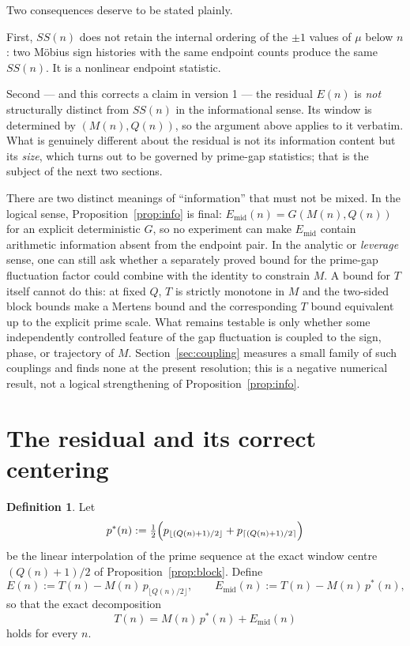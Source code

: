 \documentclass[11pt]{amsart}
\numberwithin{equation}{section}
\theoremstyle{plain}
\theoremstyle{definition}
\newtheorem{definition}[theorem]{Definition}
\theoremstyle{remark}
\newcommand{\mob}{\mu}
\newcommand{\Mert}{M}
\newcommand{\Sq}{Q}
\begin{document}
Two consequences deserve to be stated plainly.

First, $SS(n)$ does not retain the internal ordering of the $\pm1$ values of
$\mob$ below $n$: two M\"obius sign histories with the same endpoint counts
produce the same $SS(n)$. It is a nonlinear endpoint statistic.

Second --- and this corrects a claim in version 1 --- the residual $E(n)$ is
\emph{not} structurally distinct from $SS(n)$ in the informational sense. Its
window is determined by $(\Mert(n),\Sq(n))$, so the argument above applies to it
verbatim. What is genuinely different about the residual is not its information
content but its \emph{size}, which turns out to be governed by prime-gap
statistics; that is the subject of the next two sections.

There are two distinct meanings of ``information'' that must not be mixed.
In the logical sense, Proposition~\ref{prop:info} is final:
$E_{\mathrm{mid}}(n)=G(\Mert(n),\Sq(n))$ for an explicit deterministic $G$, so
no experiment can make $E_{\mathrm{mid}}$ contain arithmetic information absent
from the endpoint pair. In the analytic or \emph{leverage} sense, one can still
ask whether a separately proved bound for the prime-gap fluctuation factor could
combine with the identity to constrain $\Mert$. A bound for $T$ itself cannot do
this: at fixed $\Sq$, $T$ is strictly monotone in $\Mert$ and the two-sided
block bounds make a Mertens bound and the corresponding $T$ bound equivalent up
to the explicit prime scale. What remains testable is only whether some
independently controlled feature of the gap fluctuation is coupled to the sign,
phase, or trajectory of $\Mert$. Section~\ref{sec:coupling} measures a small
family of such couplings and finds none at the present resolution; this is a
negative numerical result, not a logical strengthening of
Proposition~\ref{prop:info}.

\section{The residual and its correct centering}
\label{sec:centering}

\begin{definition}
\label{def:residuals}
Let
\begin{equation}
\label{eq:pstar-definition}
p^{*}(n):=\tfrac12\Bigl(p_{\lfloor (\Sq(n)+1)/2\rfloor}+p_{\lceil (\Sq(n)+1)/2\rceil}\Bigr)
\end{equation}
be the linear interpolation of the prime sequence at the exact window centre
$(\Sq(n)+1)/2$ of Proposition~\ref{prop:block}. Define
\begin{equation}
\label{eq:residual-definitions}
E(n):=T(n)-\Mert(n)\,p_{\lfloor \Sq(n)/2\rfloor},
\qquad
E_{\mathrm{mid}}(n):=T(n)-\Mert(n)\,p^{*}(n),
\end{equation}
so that the exact decomposition
\begin{equation}
\label{eq:centered-decomposition}
\boxed{\;T(n)=\Mert(n)\,p^{*}(n)+E_{\mathrm{mid}}(n)\;}
\end{equation}
holds for every $n$.
\end{definition}
\end{document}
